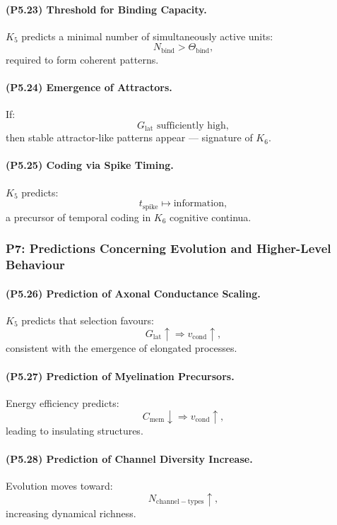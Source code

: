 \paragraph{(P5.23) Threshold for Binding Capacity.}
$K_5$ predicts a minimal number of simultaneously active units:
\[
N_{\mathrm{bind}} > \Theta_{\mathrm{bind}},
\]
required to form coherent patterns.

\paragraph{(P5.24) Emergence of Attractors.}
If:
\[
G_{\mathrm{lat}} \text{ sufficiently high},
\]
then stable attractor-like patterns appear — signature of $K_6$.

\paragraph{(P5.25) Coding via Spike Timing.}
$K_5$ predicts:
\[
t_{\mathrm{spike}} \mapsto \text{information},
\]
a precursor of temporal coding in $K_6$ cognitive continua.

\subsubsection{P7: Predictions Concerning Evolution and Higher-Level Behaviour}

\paragraph{(P5.26) Prediction of Axonal Conductance Scaling.}
$K_5$ predicts that selection favours:
\[
G_{\mathrm{lat}} \uparrow \Rightarrow v_{\mathrm{cond}} \uparrow,
\]
consistent with the emergence of elongated processes.

\paragraph{(P5.27) Prediction of Myelination Precursors.}
Energy efficiency predicts:
\[
C_{\mathrm{mem}} \downarrow
\Rightarrow v_{\mathrm{cond}} \uparrow,
\]
leading to insulating structures.

\paragraph{(P5.28) Prediction of Channel Diversity Increase.}
Evolution moves toward:
\[
N_{\mathrm{channel-types}} \uparrow,
\]
increasing dynamical richness.

